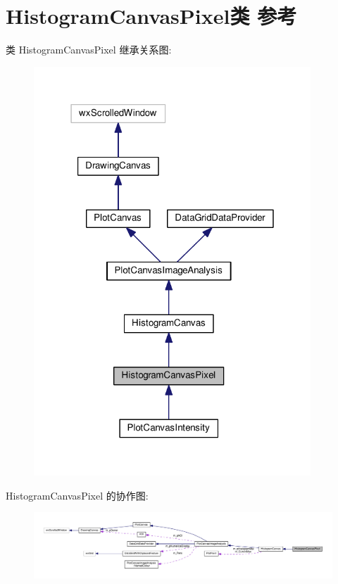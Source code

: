 \hypertarget{class_histogram_canvas_pixel}{\section{Histogram\+Canvas\+Pixel类 参考}
\label{class_histogram_canvas_pixel}
}


类 Histogram\+Canvas\+Pixel 继承关系图\+:
\nopagebreak
\begin{figure}[H]
\begin{center}
\leavevmode
\includegraphics[width=295pt]{class_histogram_canvas_pixel__inherit__graph}
\end{center}
\end{figure}


Histogram\+Canvas\+Pixel 的协作图\+:
\nopagebreak
\begin{figure}[H]
\begin{center}
\leavevmode
\includegraphics[width=350pt]{class_histogram_canvas_pixel__coll__graph}
\end{center}
\end{figure}
